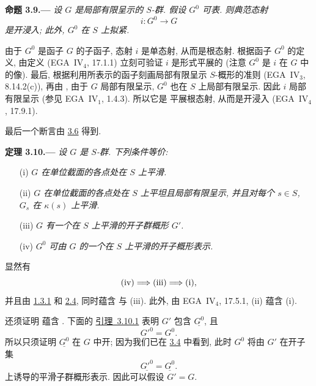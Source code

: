 
\medskip
{}\label{prop:sga3-VIB-3.9}%
\noindent\textbf{命题 3.9.---}
\emph{设 \(G\) 是局部有限呈示的 \(S\)-群.
假设 \(G^0\) 可表. 则典范态射}
\[
  i:G^0\longrightarrow G
\]
\emph{是开浸入; 此外, \(G^0\) 在 \(S\) 上拟紧.}

由于 \(G^0\) 是函子 \(G\) 的子函子, 态射
\(i\) 是单态射, 从而是根态射. 根据函子 \(G^0\) 的定义,
由定义 (EGA~IV\(_4\), 17.1.1) 立刻可验证 \(i\) 是形式平展的
(注意 \(G^0\) 是 \(i\) 在 \(G\) 中的像).
最后, 根据利用所表示的函子刻画局部有限呈示 \(S\)-概形的准则
(EGA~IV\(_3\), 8.14.2(c)), 再由 ,
由于 \(G\) 局部有限呈示, \(G^0\) 也在 \(S\) 上局部有限呈示.
因此 \(i\) 局部有限呈示 (参见 EGA~IV\(_1\), 1.4.3).
所以它是 平展根态射, 从而是开浸入 (EGA~IV\(_4\), 17.9.1).

最后一个断言由 \hyperref[cor:sga3-VIB-3.6]{3.6} 得到.

\medskip
{}\label{thm:sga3-VIB-3.10}%
\noindent\textbf{定理 3.10.---}
\emph{设 \(G\) 是 \(S\)-群. 下列条件等价:}
\begin{enumerate}
\item[\textup{(i)}] \emph{\(G\) 在单位截面的各点处在 \(S\) 上平滑.}
\item[\textup{(ii)}] \emph{\(G\) 在单位截面的各点处在 \(S\) 上平坦且局部有限呈示,
  并且对每个 \(s\in S\), \(G_s\) 在 \(\kappa(s)\) 上平滑.}
\item[\textup{\SGAInlineRefTarget{thm:sga3-VIB-3.10:item:iii}(iii)}] \emph{\(G\)
  有一个在 \(S\) 上平滑的开子群概形 \(G'\).}
\item[\textup{\SGAInlineRefTarget{thm:sga3-VIB-3.10:item:iv}(iv)}] \emph{\(G^0\)
  可由 \(G\) 的一个在 \(S\) 上平滑的开子概形表示.}
\end{enumerate}

显然有
\[
  \textup{(iv)}\Longrightarrow\textup{(iii)}
  \Longrightarrow\textup{(i)},
\]
并且由 \hyperref[cor:sga3-VIB-1.3.1]{1.3.1} 和 \hyperref[cor:sga3-VIB-2.4]{2.4},
\textup{} 同时蕴含
\textup{} 与 \textup{(iii)}.
此外, 由 EGA~IV\(_4\), 17.5.1, \textup{(ii)} 蕴含 \textup{(i)}.

还须证明 \textup{} 蕴含
\textup{}.
下面的 \hyperref[lem:sga3-VIB-3.10.1]{引理~3.10.1} 表明 \(G'\) 包含 \(\underline{G^0}\), 且
\[
  G'^0=G^0.
\]
所以只须证明 \(\underline{G^0}\) 在 \(G\) 中开; 因为我们已在
\hyperref[case:sga3-VIB-3.4]{3.4} 中看到, 此时 \(G^0\) 将由
\(G'\) 在开子集
\[
  \underline{G'^0}=\underline{G^0}.
\]
上诱导的平滑子群概形表示. 因此可以假设 \(G'=G\).

